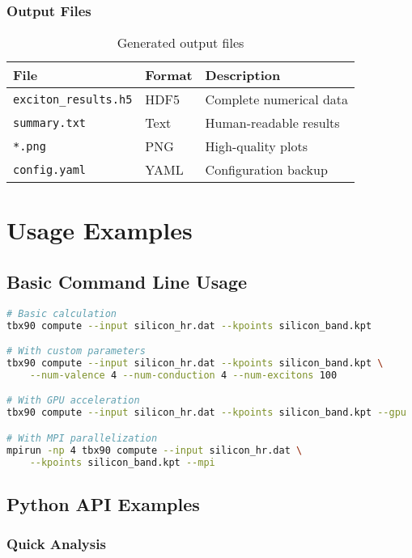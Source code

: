 \documentclass[11pt,a4paper]{article}
\newcommand{\code}[1]{\texttt{#1}}
\begin{document}
\subsubsection{Output Files}

\begin{table}[H]
\centering
\begin{tabular}{lll}
\toprule
File & Format & Description \\
\midrule
\code{exciton\_results.h5} & HDF5 & Complete numerical data \\
\code{summary.txt} & Text & Human-readable results \\
\code{*.png} & PNG & High-quality plots \\
\code{config.yaml} & YAML & Configuration backup \\
\bottomrule
\end{tabular}
\caption{Generated output files}
\end{table}

\section{Usage Examples}

\subsection{Basic Command Line Usage}

\begin{lstlisting}[language=bash]
# Basic calculation
tbx90 compute --input silicon_hr.dat --kpoints silicon_band.kpt

# With custom parameters
tbx90 compute --input silicon_hr.dat --kpoints silicon_band.kpt \
    --num-valence 4 --num-conduction 4 --num-excitons 100

# With GPU acceleration
tbx90 compute --input silicon_hr.dat --kpoints silicon_band.kpt --gpu

# With MPI parallelization
mpirun -np 4 tbx90 compute --input silicon_hr.dat \
    --kpoints silicon_band.kpt --mpi
\end{lstlisting}

\subsection{Python API Examples}

\subsubsection{Quick Analysis}
\end{document}

